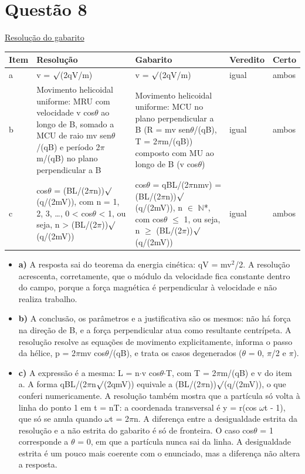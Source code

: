 \documentclass{article}%
\begin{document}
\section*{Questão 8}%
\href{https://poliedroresolve.sistemapoliedro.com.br/vestibulares/ita/2027/ita-2-fase-dia-3-22-10-2026-2-fase-dia-3/dissertativa-8-fisica-2-fase-dia-3-ita-2027}{Resolução do gabarito}\par\smallskip%
\begin{longtable}{@{}p{} p{} p{} p{} p{}@{}}\toprule Item & Resolução & Gabarito & Veredito & Certo \\ \midrule
a & v = $\surd$(2qV/m) & v = $\surd$(2qV/m) & igual & ambos \\
b & Movimento helicoidal uniforme: MRU com velocidade v cos$\theta$ ao longo de B, somado a MCU de raio mv sen$\theta$/(qB) e período 2$\pi$m/(qB) no plano perpendicular a B & Movimento helicoidal uniforme: MCU no plano perpendicular a B (R = mv sen$\theta$/(qB), T = 2$\pi$m/(qB)) composto com MU ao longo de B (v cos$\theta$) & igual & ambos \\
c & cos$\theta$ = (BL/(2$\pi$n))$\surd$(q/(2mV)), com n = 1, 2, 3, \ldots{}, 0 < cos$\theta$ < 1, ou seja, n > (BL/(2$\pi$))$\surd$(q/(2mV)) & cos$\theta$ = qBL/(2$\pi$nmv) = (BL/(2$\pi$n))$\surd$(q/(2mV)), n $\in$ $\mathbb{N}$*, com cos$\theta$ $\leq$ 1, ou seja, n $\geq$ (BL/(2$\pi$))$\surd$(q/(2mV)) & igual & ambos \\
\bottomrule\end{longtable}%
\begin{itemize}%
\item%
\textbf{a)} A resposta sai do teorema da energia cinética: qV = mv$^2$/2. A resolução acrescenta, corretamente, que o módulo da velocidade fica constante dentro do campo, porque a força magnética é perpendicular à velocidade e não realiza trabalho.%
\item%
\textbf{b)} A conclusão, os parâmetros e a justificativa são os mesmos: não há força na direção de B, e a força perpendicular atua como resultante centrípeta. A resolução resolve as equações de movimento explicitamente, informa o passo da hélice, p = 2$\pi$mv cos$\theta$/(qB), e trata os casos degenerados ($\theta$ = 0, $\pi$/2 e $\pi$).%
\item%
\textbf{c)} A expressão é a mesma: L = n$\cdot$v cos$\theta$$\cdot$T, com T = 2$\pi$m/(qB) e v do item a. A forma qBL/(2$\pi$n$\surd$(2qmV)) equivale a (BL/(2$\pi$n))$\surd$(q/(2mV)), o que conferi numericamente. A resolução também mostra que a partícula só volta à linha do ponto 1 em t = nT: a coordenada transversal é y = r(cos $\omega$t - 1), que só se anula quando $\omega$t = 2$\pi$n. A diferença entre a desigualdade estrita da resolução e a não estrita do gabarito é só de fronteira. O caso cos$\theta$ = 1 corresponde a $\theta$ = 0, em que a partícula nunca sai da linha. A desigualdade estrita é um pouco mais coerente com o enunciado, mas a diferença não altera a resposta.%
\end{itemize}%
\end{document}
